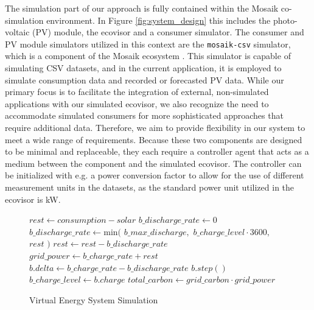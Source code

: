 The simulation part of our approach is fully contained within the Mosaik
co-simulation environment. In Figure \ref{fig:system_design} this includes the
photo-voltaic (PV) module, the ecovisor and a consumer simulator. The consumer
and PV module simulators utilized in this context are the \texttt{mosaik-csv}
simulator, which is a component of the Mosaik ecosystem \cite{mosaik_ecosystem}.
This simulator is capable of simulating CSV datasets, and in the current
application, it is employed to simulate consumption data and recorded or
forecasted PV data. While our primary focus is to facilitate the integration of
external, non-simulated applications with our simulated ecovisor, we also
recognize the need to accommodate simulated consumers for more sophisticated
approaches that require additional data. Therefore, we aim to provide
flexibility in our system to meet a wide range of requirements. Because these
two components are designed to be minimal and replaceable, they each require a
controller agent that acts as a medium between the component and the simulated
ecovisor. The controller can be initialized with e.g. a power conversion factor
to allow for the use of different measurement units in the datasets, as the
standard power unit utilized in the ecovisor is kW.



\begin{figure}
    \removelatexerror
    \begin{algorithm}[H]
        \caption{Virtual Energy System Simulation}
        \label{alg:virtual_energy_system_simulation}
        $rest \gets consumption - solar$\;
         {
            $b\_discharge\_rate \gets 0$\;
        }{
            $b\_discharge\_rate \gets \text{min}($\;
            \Indp
                $b\_max\_discharge,$\;
                $b\_charge\_level \cdot 3600,$\;
                $rest$\;
            \Indm
            $)$\;
            $rest \gets rest - b\_discharge\_rate$\;
        }
        $grid\_power \gets b\_charge\_rate + rest$\;
        $b.delta \gets b\_charge\_rate - b\_discharge\_rate$\;
        $b.step()$\;
        $b\_charge\_level \gets b.charge$\;
        $total\_carbon \gets grid\_carbon \cdot grid\_power$\;
        \vspace{3mm}
    \end{algorithm}
\end{figure}

